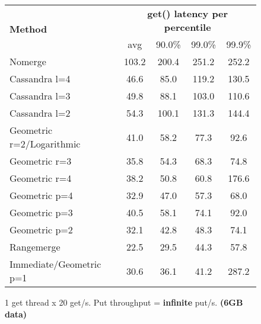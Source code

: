 \documentclass[11pt]{article}
\begin{document}
\begin{figure}[ht]
\begin{center}
\begin{tabular}{|l|c|c|c|c|}
\hline
\multirow{2}{*}{\textbf{Method}} & \multicolumn{4}{c|}{\textbf{get() latency per percentile}} \\
                                 & avg & 90.0\% & 99.0\% & 99.9\% \\
\hline
\hline
Nomerge                   & 103.2 & 200.4 & 251.2 & 252.2 \\
\hline
Cassandra l=4             &  46.6 &  85.0 & 119.2 & 130.5 \\
\hline
Cassandra l=3             &  49.8 &  88.1 & 103.0 & 110.6 \\
\hline
Cassandra l=2             &  54.3 & 100.1 & 131.3 & 144.4 \\
\hline
Geometric r=2/Logarithmic &  41.0 &  58.2 &  77.3 &  92.6 \\
\hline
Geometric r=3             &  35.8 &  54.3 &  68.3 &  74.8 \\
\hline
Geometric r=4             &  38.2 &  50.8 &  60.8 & 176.6 \\
\hline
Geometric p=4             &  32.9 &  47.0 &  57.3 &  68.0 \\
\hline
Geometric p=3             &  40.5 &  58.1 &  74.1 &  92.0 \\
\hline
Geometric p=2             &  32.1 &  42.8 &  48.3 &  74.1 \\
\hline
Rangemerge                &  22.5 &  29.5 &  44.3 &  57.8 \\
\hline
Immediate/Geometric p=1   &  30.6 &  36.1 &  41.2 & 287.2 \\
\hline
\end{tabular} 
\caption{1 get thread x 20 get/s. Put throughput = \textbf{infinite} put/s. \textbf{(6GB data)}}
\end{center}
\end{figure}

\clearpage

\end{document}
